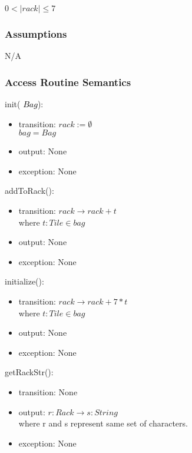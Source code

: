 \documentclass[12pt]{article}
\begin{document}
$0 < |rack| \leq 7$

\subsubsection* {Assumptions}

N/A

\begin{itemize}

\end{itemize}

\subsubsection* {Access Routine Semantics}

\noindent init(\textcolor{black}{ $Bag$}):
\begin{itemize}
\item transition: $rack := \emptyset $ \\
$bag = Bag$
\item output: None
\item exception: None
\end{itemize}

\noindent addToRack():
\begin{itemize}
\item transition: $rack \rightarrow rack + t$ \\
        where $t : Tile \in bag$
\item output: None
\item exception: None
\end{itemize}

\noindent initialize():
\begin{itemize}
\item transition: $rack \rightarrow rack + 7*t$ \\
        where $t : Tile \in bag$
\item output: None
\item exception: None
\end{itemize}

\newpage

\noindent getRackStr():
\begin{itemize}
\item transition: None
\item output: $r:Rack \rightarrow s:String$ \\
where r and s represent same set of characters.
\item exception: None
\end{itemize}
\end{document}
